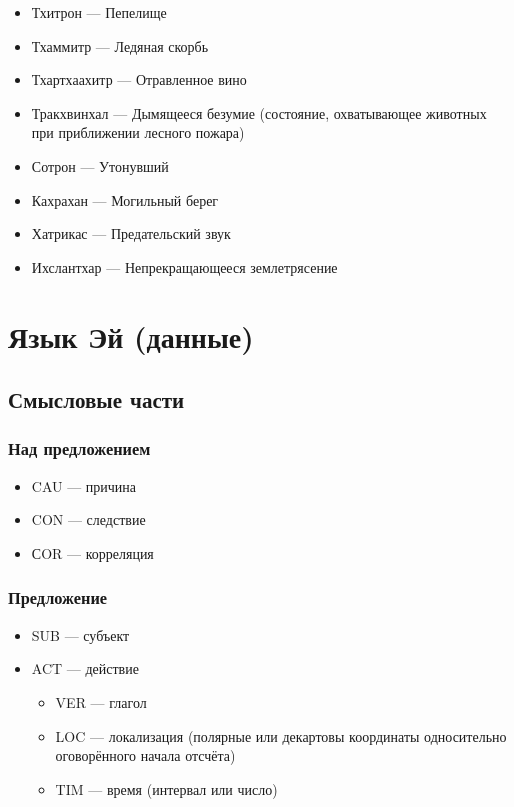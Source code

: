 \documentclass[a4paper,12pt,fleqn]{book}\usepackage{polyglossia}\setdefaultlanguage[babelshorthands=true]{russian}\setotherlanguage{english}\defaultfontfeatures{Ligatures=TeX,Mapping=tex-text}\usepackage{xcolor}\newcommand{\ml}[3]{#2}
\begin{document}
{\begin{itemize}
\item Тхитрон --- Пепелище
\item Тхаммитр --- Ледяная скорбь
\item Тхартхаахитр --- Отравленное вино
\item Тракхвинхал --- Дымящееся безумие (состояние, охватывающее животных при приближении лесного пожара)
\item Сотрон --- Утонувший
\item Кахрахан --- Могильный берег
\item Хатрикас --- Предательский звук
\item Ихслантхар --- Непрекращающееся землетрясение
\end{itemize}

\section{Язык Эй (данные)}

\subsection{Смысловые части}

\subsubsection{Над предложением}

\begin{itemize}
\item CAU --- причина
\item CON --- следствие
\item СOR --- корреляция
\end{itemize}

\subsubsection{Предложение}

\begin{itemize}
\item SUB --- субъект
\item ACT --- действие
\begin{itemize}
\item VER --- глагол
\item LOC --- локализация (полярные или декартовы координаты односительно оговорённого начала отсчёта)
\item TIM --- время (интервал или число)
\end{itemize}
\end{itemize}

}
\end{document}
